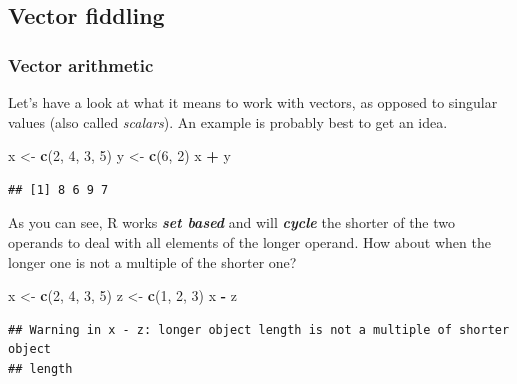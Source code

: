 \documentclass[]{book}
\newenvironment{Shaded}{\begin{snugshade}}{\end{snugshade}}
\newcommand{\DecValTok}[1]{\textcolor[rgb]{0.00,0.00,0.81}{#1}}
\newcommand{\KeywordTok}[1]{\textcolor[rgb]{0.13,0.29,0.53}{\textbf{#1}}}
\newcommand{\NormalTok}[1]{#1}
\newcommand{\OperatorTok}[1]{\textcolor[rgb]{0.81,0.36,0.00}{\textbf{#1}}}
\newcommand{\StringTok}[1]{\textcolor[rgb]{0.31,0.60,0.02}{#1}}
\begin{document}
\hypertarget{vector-fiddling}{%
\subsection{Vector fiddling}\label{vector-fiddling}}

\hypertarget{vector-arithmetic}{%
\subsubsection*{Vector arithmetic}\label{vector-arithmetic}}

Let's have a look at what it means to work with vectors, as opposed to singular values (also called \emph{scalars}). An example is probably best to get an idea.

\begin{Shaded}
\begin{Highlighting}[]
\NormalTok{x <-}\StringTok{ }\KeywordTok{c}\NormalTok{(}\DecValTok{2}\NormalTok{, }\DecValTok{4}\NormalTok{, }\DecValTok{3}\NormalTok{, }\DecValTok{5}\NormalTok{)}
\NormalTok{y <-}\StringTok{ }\KeywordTok{c}\NormalTok{(}\DecValTok{6}\NormalTok{, }\DecValTok{2}\NormalTok{)}
\NormalTok{x }\OperatorTok{+}\StringTok{ }\NormalTok{y}
\end{Highlighting}
\end{Shaded}

\begin{verbatim}
## [1] 8 6 9 7
\end{verbatim}

As you can see, R works \textbf{\emph{set based}} and will \textbf{\emph{cycle}} the shorter of the two operands to deal with all elements of the longer operand. How about when the longer one is not a multiple of the shorter one?

\begin{Shaded}
\begin{Highlighting}[]
\NormalTok{x <-}\StringTok{ }\KeywordTok{c}\NormalTok{(}\DecValTok{2}\NormalTok{, }\DecValTok{4}\NormalTok{, }\DecValTok{3}\NormalTok{, }\DecValTok{5}\NormalTok{)}
\NormalTok{z <-}\StringTok{ }\KeywordTok{c}\NormalTok{(}\DecValTok{1}\NormalTok{, }\DecValTok{2}\NormalTok{, }\DecValTok{3}\NormalTok{)}
\NormalTok{x }\OperatorTok{-}\StringTok{ }\NormalTok{z}
\end{Highlighting}
\end{Shaded}

\begin{verbatim}
## Warning in x - z: longer object length is not a multiple of shorter object
## length
\end{verbatim}
\end{document}
